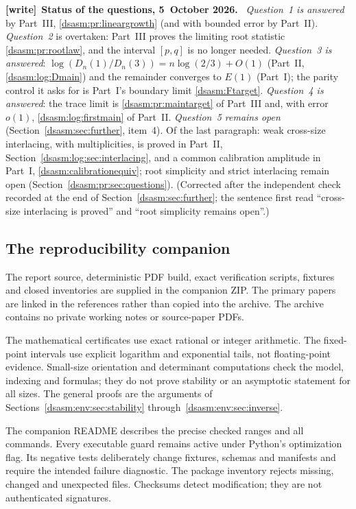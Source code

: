 \documentclass[11pt,letterpaper]{article}
\theoremstyle{remark}\newtheorem{remark}[theorem]{Remark}
\newenvironment{writenote}[1][]{\par\smallskip\begingroup\small
 \noindent\textbf{[write]}\if\relax\detokenize{#1}\relax\else~\textbf{#1.}\fi\ }%
 {\par\endgroup\smallskip}
\begin{document}
\begin{writenote}[Status of the questions, 5~October 2026]
\emph{Question~1 is answered} by Part~III, \eqref{dsasm:pr:lineargrowth} (and with bounded error by Part~II). \emph{Question~2} is overtaken: Part~III proves the limiting root statistic \eqref{dsasm:pr:rootlaw}, and the interval $[p,q]$ is no longer needed. \emph{Question~3 is answered}: $\log(D_n(1)/D_n(3))=n\log(2/3)+O(1)$ (Part~II, \eqref{dsasm:log:Dmain}) and the remainder converges to $E(1)$ (Part~I); the parity control it asks for is Part~I's boundary limit \eqref{dsasm:Ftarget}. \emph{Question~4 is answered}: the trace limit is \eqref{dsasm:pr:maintarget} of Part~III and, with error $o(1)$, \eqref{dsasm:log:firstmain} of Part~II. \emph{Question~5 remains open} (Section~\ref{dsasm:sec:further}, item~4). Of the last paragraph: weak cross-size interlacing, with multiplicities, is proved in Part~II, Section~\ref{dsasm:log:sec:interlacing}, and a common calibration amplitude in Part~I, \eqref{dsasm:calibrationequiv}; root simplicity and strict interlacing remain open (Section~\ref{dsasm:pr:sec:questions}). (Corrected after the independent check recorded at the end of Section~\ref{dsasm:sec:further}; the sentence first read ``cross-size interlacing is proved'' and ``root simplicity remains open''.)
\end{writenote}


\subsection{The reproducibility companion}
The report source, deterministic PDF build, exact verification scripts,
fixtures and closed inventories are supplied in the companion ZIP.
The primary papers are linked in the references rather than copied
into the archive. The archive contains no private working notes or
source-paper PDFs.

The mathematical certificates use exact rational or integer
arithmetic. The fixed-point intervals use explicit logarithm and
exponential tails, not floating-point evidence. Small-size orientation
and determinant computations check the model, indexing and formulas;
they do not prove stability or an asymptotic statement for all sizes.
The general proofs are the arguments of Sections~\ref{dsasm:env:sec:stability}
through~\ref{dsasm:env:sec:inverse}.

The companion README describes the precise checked ranges and all
commands. Every executable guard remains active under Python's
optimization flag. Its negative tests deliberately change fixtures,
schemas and manifests and require the intended failure diagnostic.
The package inventory rejects missing, changed and unexpected files.
Checksums detect modification; they are not authenticated signatures.
\end{document}
